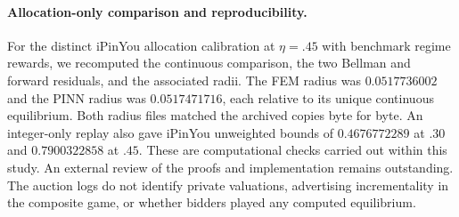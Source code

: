 \paragraph{Allocation-only comparison and reproducibility.}
For the distinct iPinYou allocation calibration at $\eta=.45$ with
benchmark regime rewards, we recomputed the continuous comparison,
the two Bellman and forward residuals, and the associated radii.
The FEM radius was $0.0517736002$ and the PINN radius was $0.0517471716$,
each relative to its unique continuous equilibrium. Both radius files
matched the archived copies byte for byte. An integer-only replay also
gave iPinYou unweighted bounds of $0.4676772289$ at $.30$ and
$0.7900322858$ at $.45$. These are computational checks carried out
within this study. An external review of the proofs and implementation
remains outstanding. The auction logs do not identify private valuations,
advertising incrementality in the composite game, or whether bidders
played any computed equilibrium.

